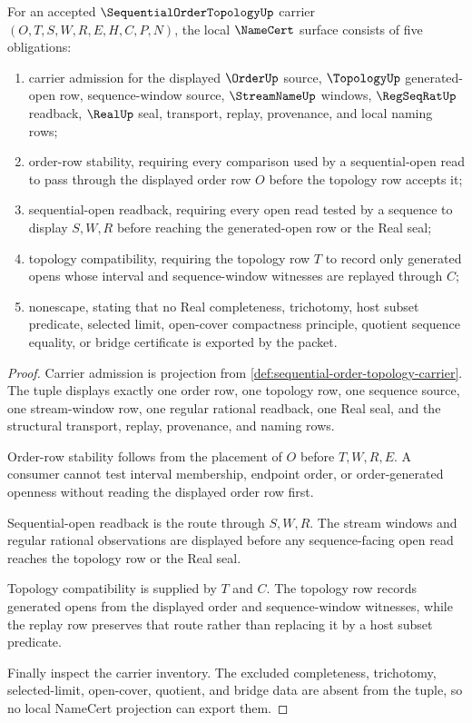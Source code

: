 \begin{theorem}
\label{thm:sequential-order-topology-namecert-obligations}
For an accepted $\SequentialOrderTopologyUp$ carrier $(O,T,S,W,R,E,H,C,P,N)$, the local $\NameCert$ surface consists of five obligations:
\begin{enumerate}
\item carrier admission for the displayed $\OrderUp$ source, $\TopologyUp$ generated-open row, sequence-window source, $\StreamNameUp$ windows, $\RegSeqRatUp$ readback, $\RealUp$ seal, transport, replay, provenance, and local naming rows;
\item order-row stability, requiring every comparison used by a sequential-open read to pass through the displayed order row $O$ before the topology row accepts it;
\item sequential-open readback, requiring every open read tested by a sequence to display $S,W,R$ before reaching the generated-open row or the Real seal;
\item topology compatibility, requiring the topology row $T$ to record only generated opens whose interval and sequence-window witnesses are replayed through $C$;
\item nonescape, stating that no Real completeness, trichotomy, host subset predicate, selected limit, open-cover compactness principle, quotient sequence equality, or bridge certificate is exported by the packet.
\end{enumerate}
\end{theorem}
\begin{proof}
Carrier admission is projection from \autoref{def:sequential-order-topology-carrier}. The tuple displays exactly one order row, one topology row, one sequence source, one stream-window row, one regular rational readback, one Real seal, and the structural transport, replay, provenance, and naming rows.

Order-row stability follows from the placement of $O$ before $T,W,R,E$. A consumer cannot test interval membership, endpoint order, or order-generated openness without reading the displayed order row first.

Sequential-open readback is the route through $S,W,R$. The stream windows and regular rational observations are displayed before any sequence-facing open read reaches the topology row or the Real seal.

Topology compatibility is supplied by $T$ and $C$. The topology row records generated opens from the displayed order and sequence-window witnesses, while the replay row preserves that route rather than replacing it by a host subset predicate.

Finally inspect the carrier inventory. The excluded completeness, trichotomy, selected-limit, open-cover, quotient, and bridge data are absent from the tuple, so no local NameCert projection can export them.
\end{proof}

